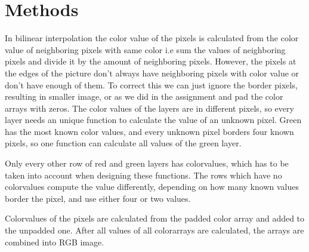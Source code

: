 \section{Methods}
In bilinear interpolation the color value of the pixels is calculated from the color value of neighboring pixels with same color i.e sum the values of neighboring pixels and divide it by the amount of neighboring pixels. However, the pixels at the edges of the picture don't always have neighboring pixels with color value or don't have enough of them. To correct this we can just ignore the border pixels, resulting in smaller image, or as we did in the assignment and pad the color arrays with zeros. The color values of the layers are in different pixels, so every layer needs an unique function to calculate the value of an unknown pixel.  Green has the most known color values, and every unknown pixel borders four known pixels, so one function can calculate all values of the green layer.

Only every other row of red and green layers has colorvalues, which has to be taken into account when designing these functions. The rows which have no colorvalues compute the value differently, depending on how many known values border the pixel, and use either four or two values.

Colorvalues of the pixels are calculated from the padded color array and added to the unpadded one. After all values of all colorarrays are calculated, the arrays are combined into RGB image.